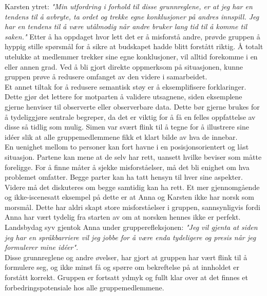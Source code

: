 Karsten ytret: \emph{"Min utfordring i forhold til disse grunnreglene, er at jeg har en tendens til å avbryte, ta ordet og trekke egne konklusjoner på andres innspill. Jeg har en tendens til å være utålmodig når andre bruker lang tid til å komme til saken."}
Etter å ha oppdaget hvor lett det er å misforstå andre, prøvde gruppen å hyppig stille spørsmål for å sikre at budskapet hadde blitt forstått riktig.
Å totalt utelukke at medlemmer trekker sine egne konklusjoner, vil alltid forekomme i en eller annen grad.
Ved å bli gjort direkte oppmerksom på situasjonen, kunne gruppen prøve å redusere omfanget av den videre i samarbeidet.
 \\
Et annet tiltak for å redusere semantisk støy er å eksemplifisere forklaringer.
Dette gjør det lettere for motparten å validere utsagnene, siden eksemplene gjerne henviser til observerte eller observerbare data.
Dette bør gjerne brukes for å tydeliggjøre sentrale begreper, da det er viktig for å få en felles oppfattelse av disse så tidlig som mulig.
Simen var svært flink til å tegne for å illustrere sine idéer slik at alle gruppemedlemmene fikk et klart bilde av hva de innebar.
\\
En uenighet mellom to personer kan fort havne i en posisjonsorientert og låst situasjon.
Partene kan mene at de selv har rett, uansett hvilke beviser som måtte foreligge.
For å finne måter å sjekke misforståelser, må det bli enighet om hva problemet omfatter. Begge parter kan ha tatt hensyn til hver sine aspekter.
Videre må det diskuteres om begge samtidig kan ha rett.
Et mer gjennomgående og ikke-iscenesatt eksempel på dette er at Anna og Karsten ikke har norsk som morsmål.
Dette har aldri skapt store misforståelser i gruppen, sannsynligvis fordi Anna har vært tydelig fra starten av om at norsken hennes ikke er perfekt.
Landsbydag syv gjentok Anna under grupperefleksjonen: \emph{"Jeg vil gjenta at siden jeg har en språkbarriere vil jeg jobbe for å være enda tydeligere og presis når jeg formulerer mine idéer"}.
\\
Disse grunnreglene og andre øvelser, har gjort at gruppen har vært flink til å formulere seg, og ikke minst få og spørre om bekreftelse på at innholdet er forstått korrekt.
Gruppen er fortsatt ydmyk og fullt klar over at det finnes et forbedringspotensiale hos alle gruppemedlemmene.
\\